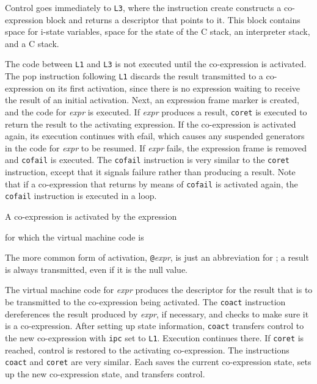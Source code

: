 Control goes immediately to \texttt{L3}, where the instruction create
constructs a co-expression block and returns a descriptor that points
to it. This block contains space for i-state variables, space for the
state of the C stack, an interpreter stack, and a C stack.

The code between \texttt{L1} and \texttt{L3} is not executed until the
co-expression is activated. The pop instruction following \texttt{L1}
discards the result transmitted to a co-expression on its first
activation, since there is no expression waiting to receive the result
of an initial activation. Next, an expression frame marker is created,
and the code for \textit{expr} is executed. If
\textit{expr} produces a result, \texttt{coret} is
executed to return the result to the activating expression. If the
co-expression is activated again, its execution continues with efail,
which causes any suspended generators in the code for
\textit{expr} to be resumed. If
\textit{expr} fails, the expression frame is removed
and \texttt{cofail} is executed. The \texttt{cofail} instruction is
very similar to the \texttt{coret} instruction, except that it signals
failure rather than producing a result. Note that if a co-expression
that returns by means of \texttt{cofail} is activated again, the
\texttt{cofail} instruction is executed in a loop.

A co-expression is activated by the expression


\noindent for which the virtual machine code is

\goodbreak
{}

The more common form of activation,
\texttt{@}\textit{expr}, is just an abbreviation for
; a result is always
transmitted, even if it is the null value.

The virtual machine code for \textit{expr} produces
the descriptor for the result that is to be transmitted to the
co-expression being activated. The \texttt{coact} instruction
dereferences the result produced by \textit{expr}, if
necessary, and checks to make sure it is a co-expression. After
setting up state information, \texttt{coact} transfers control to the
new co-expression with \texttt{ipc} set to \texttt{L1}. Execution
continues there. If \texttt{coret} is reached, control is restored to
the activating co-expression. The instructions \texttt{coact} and
\texttt{coret} are very similar. Each saves the current co-expression
state, sets up the new co-expression state, and transfers control.

